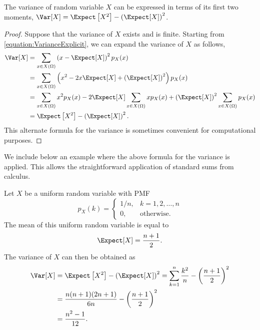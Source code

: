 \begin{proposition}
The variance of random variable $X$ can be expressed in terms of its first two moments,
$\Var [X] = \Expect \left[ X^2 \right] - \left( \Expect [X] \right)^2$.
\end{proposition}
\begin{proof}
Suppose that the variance of $X$ exists and is finite.
Starting from \eqref{equation:VarianceExplicit}, we can expand the variance of $X$ as follows,
\begin{equation*}
\begin{split}
\Var [X] &= \sum_{x \in X(\Omega)} \left( x - \Expect [X] \right)^2 p_X (x) \\
&= \sum_{x \in X(\Omega)} \left( x^2 - 2 x \Expect [X] + \left( \Expect [X] \right)^2 \right) p_X (x) \\
&= \sum_{x \in X(\Omega)} x^2 p_X (x) - 2 \Expect [X] \sum_{x \in X(\Omega)} x p_X (x) + \left( \Expect [X] \right)^2 \sum_{x \in X(\Omega)} p_X (x) \\
&= \Expect \left[ X^2 \right] - \left( \Expect [X] \right)^2.
\end{split}
\end{equation*}
This alternate formula for the variance is sometimes convenient for computational purposes.
\end{proof}

We include below an example where the above formula for the variance is applied.
This allows the straightforward application of standard sums from calculus.

\begin{example}
Let $X$ be a uniform random variable with PMF
\begin{equation*}
p_X (k) = \begin{cases}
1/n, & k = 1, 2, \ldots, n \\
0, & \text{otherwise} .
\end{cases}
\end{equation*}
The mean of this uniform random variable is equal to
\begin{equation*}
\Expect [X] = \frac{n+1}{2} .
\end{equation*}
The variance of $X$ can then be obtained as
\begin{equation*}
\begin{split}
\Var [X] &= \Expect \left[ X^2 \right] - \left( \Expect [X] \right)^2
= \sum_{k=1}^n \frac{k^2}{n} - \left( \frac{n+1}{2} \right)^2 \\
&= \frac{n(n+1)(2n+1)}{6n} - \left( \frac{n+1}{2} \right)^2 \\
&= \frac{n^2 - 1}{12} .
\end{split}
\end{equation*}
\end{example}

